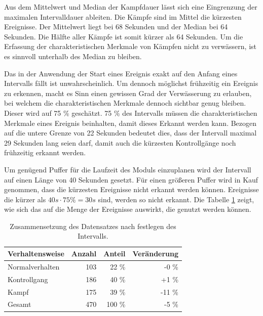 Aus dem Mittelwert und Median der Kampfdauer lässt sich eine Eingrenzung der maximalen Intervalldauer ableiten. Die Kämpfe sind im Mittel die kürzesten Ereignisse. Der Mittelwert liegt bei 68 Sekunden und der Median bei 64 Sekunden. Die Hälfte aller Kämpfe ist somit kürzer als 64 Sekunden. Um die Erfassung der charakteristischen Merkmale von Kämpfen nicht zu verwässern, ist es sinnvoll unterhalb des Median zu bleiben. \par

Das in der Anwendung der Start eines Ereignis exakt auf den Anfang eines Intervalls fällt ist unwahrscheinlich. Um dennoch möglichst frühzeitig ein Ereignis zu erkennen, macht es Sinn einen gewissen Grad der Verwässerung zu erlauben, bei welchem die charakteristischen Merkmale dennoch sichtbar genug bleiben. Dieser wird auf 75 \% geschätzt. 75 \% des Intervalls müssen die charakteristischen Merkmale eines Ereignis beinhalten, damit dieses Erkannt werden kann. Bezogen auf die untere Grenze von 22 Sekunden bedeutet dies, dass der Intervall maximal 29 Sekunden lang seien darf, damit auch die kürzesten Kontrollgänge noch frühzeitig erkannt werden. \par

Um genügend Puffer für die Laufzeit des Moduls einzuplanen wird der Intervall auf einen Länge von 40 Sekunden gesetzt. Für einen größeren Puffer wird in Kauf genommen, dass die kürzesten Ereignisse nicht erkannt werden können. Ereignisse die kürzer als \(40 s \cdot 75 \% = 30 s\) sind, werden so nicht erkannt. Die Tabelle \ref{tab:DataNachIntervall} zeigt, wie sich das auf die Menge der Ereignisse auswirkt, die genutzt werden können.\par

\begin{table}[ht]
    \centering
    \caption{Zusammensetzung des Datensatzes nach festlegen des Intervalls.}
    \begin{tabular}{|l|r|r|r|}
    \hline
        Verhaltensweise & Anzahl & Anteil & Veränderung\\
    \hline
        Normalverhalten & 103 & 22 \% & -0 \%\\
        Kontrollgang & 186 & 40 \% & +1 \%\\
        Kampf & 175 & 39 \% & -11 \%\\
    \hline
    \hline
        Gesamt & 470 & 100 \% & -5 \% \\
    \hline
    \end{tabular}
    \label{tab:DataNachIntervall}
\end{table}

